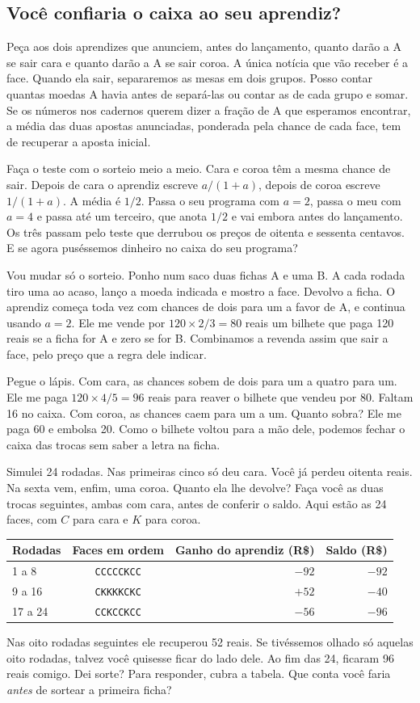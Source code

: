 \documentclass[12pt,oneside]{article}
\newcommand{\secao}[1]{\Needspace{5.2\baselineskip}\subsection*{#1}}
\begin{document}
\secao{Você confiaria o caixa ao seu aprendiz?}
Peça aos dois aprendizes que anunciem, antes do lançamento, quanto darão a A se sair cara e quanto darão a A se sair coroa. A única notícia que vão receber é a face. Quando ela sair, separaremos as mesas em dois grupos. Posso contar quantas moedas A havia antes de separá-las ou contar as de cada grupo e somar. Se os números nos cadernos querem dizer a fração de A que esperamos encontrar, a média das duas apostas anunciadas, ponderada pela chance de cada face, tem de recuperar a aposta inicial.

Faça o teste com o sorteio meio a meio. Cara e coroa têm a mesma chance de sair. Depois de cara o aprendiz escreve $a/(1+a)$, depois de coroa escreve $1/(1+a)$. A média é $1/2$. Passa o seu programa com $a=2$, passa o meu com $a=4$ e passa até um terceiro, que anota $1/2$ e vai embora antes do lançamento. Os três passam pelo teste que derrubou os preços de oitenta e sessenta centavos. E se agora puséssemos dinheiro no caixa do seu programa?

Vou mudar só o sorteio. Ponho num saco duas fichas A e uma B. A cada rodada tiro uma ao acaso, lanço a moeda indicada e mostro a face. Devolvo a ficha. O aprendiz começa toda vez com chances de dois para um a favor de A, e continua usando $a=2$. Ele me vende por $120\times 2/3=80$ reais um bilhete que paga 120 reais se a ficha for A e zero se for B. Combinamos a revenda assim que sair a face, pelo preço que a regra dele indicar.

Pegue o lápis. Com cara, as chances sobem de dois para um a quatro para um. Ele me paga $120\times 4/5=96$ reais para reaver o bilhete que vendeu por 80. Faltam 16 no caixa. Com coroa, as chances caem para um a um. Quanto sobra? Ele me paga 60 e embolsa 20. Como o bilhete voltou para a mão dele, podemos fechar o caixa das trocas sem saber a letra na ficha.

Simulei 24 rodadas. Nas primeiras cinco só deu cara. Você já perdeu oitenta reais. Na sexta vem, enfim, uma coroa. Quanto ela lhe devolve? Faça você as duas trocas seguintes, ambas com cara, antes de conferir o saldo. Aqui estão as 24 faces, com $C$ para cara e $K$ para coroa.
\begin{center}
{\small
\begin{tabular}{@{}lcrr@{}}
\toprule
Rodadas & Faces em ordem & Ganho do aprendiz (R\$) & Saldo (R\$) \\
\midrule
1 a 8 & \texttt{CCCCCKCC} & $-92$ & $-92$ \\
9 a 16 & \texttt{CKKKKCKC} & $+52$ & $-40$ \\
17 a 24 & \texttt{CCKCCKCC} & $-56$ & $-96$ \\
\bottomrule
\end{tabular}}
\end{center}
Nas oito rodadas seguintes ele recuperou 52 reais. Se tivéssemos olhado só aquelas oito rodadas, talvez você quisesse ficar do lado dele. Ao fim das 24, ficaram 96 reais comigo. Dei sorte? Para responder, cubra a tabela. Que conta você faria \emph{antes} de sortear a primeira ficha?
\end{document}
